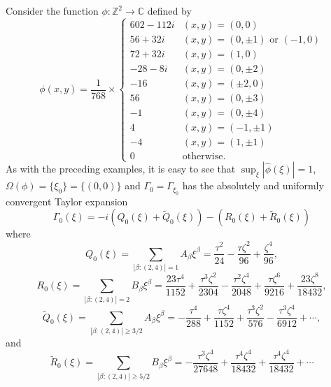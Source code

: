 \documentclass[11pt, letter]{book}
\newenvironment{example}
  {\pushQED{\qed}\renewcommand{\qedsymbol}{$\triangle$}\examplex}
  {\popQED\endexamplex}
\newcommand{\f}[2]{\frac{#1}{#2}}
\begin{document}
\begin{example}\normalfont
Consider the function $\phi : \mathbb{Z}^2 \to \mathbb{C}$ defined by 
\begin{equation*}
    \phi(x,y) = 
    \f{1}{768}\times
    \begin{cases}
    602 - 112i &(x,y) = (0,0)\\
    56 + 32i   &(x,y) = (0,\pm 1)\mbox{ or }(-1,0)\\
    72 + 32i   &(x,y) = (1,0)\\
    -28 - 8i   &(x,y) = (0,\pm 2)\\
    -16        &(x,y) = (\pm 2,0)\\
    56         &(x,y) = (0,\pm 3)\\
    -1         &(x,y) = (0,\pm 4)\\
    4          &(x,y) = (-1,\pm 1)\\
    -4         &(x,y) = (1,\pm 1)\\
    0          &\text{otherwise}.
    \end{cases}
\end{equation*}
As with the preceding examples, it is easy to see that $\sup_{\xi}|\widehat{\phi}(\xi)|=1$, $\Omega(\phi)=\{\xi_0\}=\{(0,0)\}$ and $\Gamma_{0}=\Gamma_{\xi_0}$ has the absolutely and uniformly convergent Taylor expansion
\begin{equation*}
    \Gamma_{0}(\xi)=-i\left(Q_0(\xi)+\widetilde{Q}_0(\xi)\right)-\left(R_0(\xi)+\widetilde{R}_0(\xi)\right)
\end{equation*}
where
\begin{equation*}
    Q_0(\xi)=\sum_{|\beta:(2,4)|=1}A_\beta \xi^\beta=\frac{\tau^2}{24}-\frac{\tau\zeta^2}{96} +\frac{ \zeta^4}{96},
\end{equation*}
\begin{equation*}
    R_0(\xi)=\sum_{|\beta:(2,4)|=2}B_\beta \xi^\beta=\frac{23\tau^4}{1152}  + \frac{\tau^3\zeta^2}{2304}  - \frac{\tau^2\zeta^4}{2048} + \f{\tau\zeta^6}{9216}+ \frac{23\zeta^8}{18432},
\end{equation*}
\begin{equation*}
    \widetilde{Q}_0(\xi)=\sum_{|\beta:(2,4)|\geq 3/2}A_\beta \xi^\beta=- \frac{\tau^4}{288}+\frac{\tau\zeta^4}{1152} +\frac{\tau^3\zeta^2}{576}  -\frac{\tau^3\zeta^4}{6912} %
    + \cdots,
\end{equation*}
and
\begin{equation*}
    \widetilde{R}_0(\xi)=\sum_{|\beta:(2,4)|\geq 5/2}B_\beta \xi^\beta
    =  - \frac{\tau^3\zeta^4}{27648} + \frac{\tau^4\zeta^4}{18432} +  \frac{\tau^4\zeta^4}{18432} + \cdots

\end{equation*}
\end{example}
\end{document}
